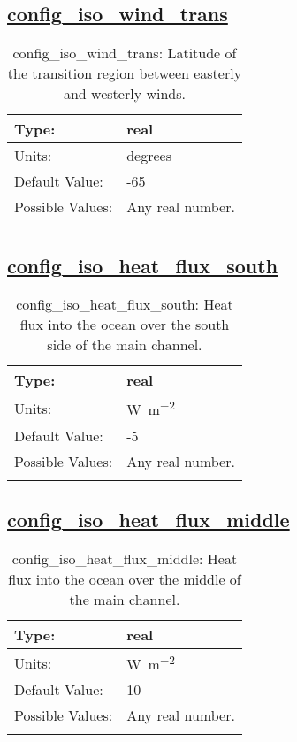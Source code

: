 \subsection[config\_iso\_wind\_trans]{\hyperref[sec:nm_tab_iso]{config\_iso\_wind\_trans}}
\label{subsec:nm_sec_config_iso_wind_trans}
\begin{center}
\begin{longtable}{| p{2.0in} || p{4.0in} |}
    \hline
    Type: & real \\
    \hline
    Units: & \si{degrees} \\
    \hline
    Default Value: & -65 \\
    \hline
    Possible Values: & Any real number. \\
    \hline
    \caption{config\_iso\_wind\_trans: Latitude of the transition region between easterly and westerly winds.}
\end{longtable}
\end{center}
\subsection[config\_iso\_heat\_flux\_south]{\hyperref[sec:nm_tab_iso]{config\_iso\_heat\_flux\_south}}
\label{subsec:nm_sec_config_iso_heat_flux_south}
\begin{center}
\begin{longtable}{| p{2.0in} || p{4.0in} |}
    \hline
    Type: & real \\
    \hline
    Units: & \si{W.m^{-2}} \\
    \hline
    Default Value: & -5 \\
    \hline
    Possible Values: & Any real number. \\
    \hline
    \caption{config\_iso\_heat\_flux\_south: Heat flux into the ocean over the south side of the main channel.}
\end{longtable}
\end{center}
\subsection[config\_iso\_heat\_flux\_middle]{\hyperref[sec:nm_tab_iso]{config\_iso\_heat\_flux\_middle}}
\label{subsec:nm_sec_config_iso_heat_flux_middle}
\begin{center}
\begin{longtable}{| p{2.0in} || p{4.0in} |}
    \hline
    Type: & real \\
    \hline
    Units: & \si{W.m^{-2}} \\
    \hline
    Default Value: & 10 \\
    \hline
    Possible Values: & Any real number. \\
    \hline
    \caption{config\_iso\_heat\_flux\_middle: Heat flux into the ocean over the middle of the main channel.}
\end{longtable}
\end{center}
